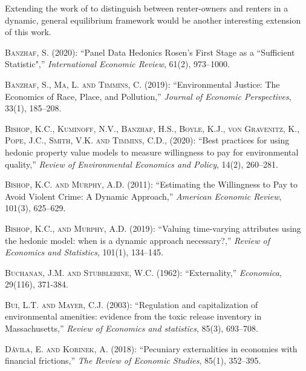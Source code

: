 \documentclass[ecta,nameyear,draft]{econsocart}
\theoremstyle{plain}
\theoremstyle{remark}
\begin{document}
Extending the work of \cite{kanemoto88} to distinguish between renter-owners and renters in a dynamic, general equilibrium framework would be another interesting extension of this work.
\begin{thebibliography}{}
%


\textsc{Banzhaf, S.} (2020):
``Panel Data Hedonics Rosen’s First Stage as a “Sufficient
Statistic",''
\textit{International Economic Review}, 61(2), 973--1000.
\endbibitem


\textsc{Banzhaf, S., Ma, L. and Timmins, C.} (2019):
``Environmental Justice: The Economics of Race, Place, and Pollution,''
\textit{Journal of Economic Perspectives}, 33(1), 185--208.
\endbibitem

\textsc{Bishop, K.C., Kuminoff, N.V., Banzhaf, H.S., Boyle, K.J., von Gravenitz, K., Pope, J.C., Smith, V.K. and Timmins, C.D., } (2020):
``Best practices for using hedonic property value models to measure willingness to pay for environmental quality,''
\textit{Review of Environmental Economics and Policy}, 14(2), 260--281.
\endbibitem

\textsc{Bishop, K.C. and Murphy, A.D.} (2011):
``Estimating the Willingness to Pay to Avoid Violent Crime: A Dynamic Approach,''
\textit{American Economic Review}, 101(3), 625--629.
\endbibitem

\textsc{Bishop, K.C., and Murphy, A.D.} (2019):
``Valuing time-varying attributes using the hedonic model: when is a dynamic approach necessary?,''
\textit{Review of Economics and Statistics}, 101(1), 134--145.
\endbibitem

\textsc{Buchanan, J.M. and Stubblebine, W.C.} (1962):
``Externality,''
\textit{Economica}, 29(116), 371-384.
\endbibitem

\textsc{Bui, L.T. and Mayer, C.J.} (2003):
``Regulation and capitalization of environmental amenities: evidence from the toxic release inventory in Massachusetts,''
\textit{Review of Economics and statistics}, 85(3), 693--708.
\endbibitem

 
\textsc{Dávila, E. and Korinek, A.} (2018):
``Pecuniary externalities in economies with financial frictions,''
\textit{The Review of Economic Studies}, 85(1), 352--395.
\endbibitem



\end{thebibliography}
\end{document}
